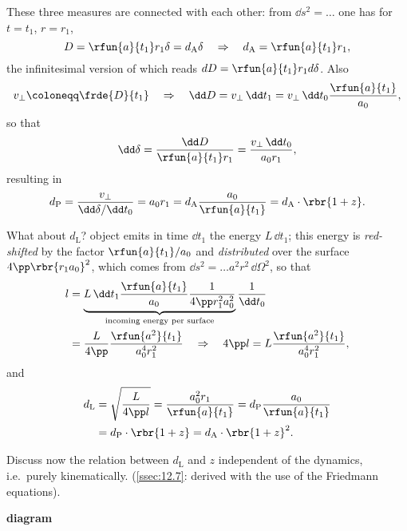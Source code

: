 These three measures are connected with each other: from $\dd s^2 = \ldots$ one
has for $t = t_1$, $r = r_1$,
\begin{equation}
D = \rfun{a}{t_1}r_1\delta = d_\text{A}\delta \quad \Rightarrow \quad
d_\text{A} = \rfun{a}{t_1}r_1,
\end{equation}
the infinitesimal version of which reads $dD = \rfun{a}{t_1}r_1d\delta$. Also
\begin{equation}
v_\perp \coloneqq \frde{D}{t_1} \quad\Rightarrow\quad
\dd D = v_\perp\,\dd t_1 = v_\perp\,\dd t_0 \frac{\rfun{a}{t_1}}{a_0},
\end{equation}
so that
\begin{equation}
\dd\delta = \frac{\dd D}{\rfun{a}{t_1}r_1} = \frac{v_\perp\,\dd t_0}{a_0 r_1},
\end{equation}
resulting in
\begin{equation}
d_\text{P} = \frac{v_\perp}{\dd \delta/\dd t_0} = a_0 r_1
= d_\text{A} \frac{a_0}{\rfun{a}{t_1}} = d_\text{A}\cdot\rbr{1+z}.
\end{equation}

What about $d_\text{L}$? object emits in time $\dd t_1$ the energy $L\,\dd t_1$;
this energy is \emph{red-shifted} by the factor $\rfun{a}{t_1}/a_0$ and
\emph{distributed} over the surface $4\pp\rbr{r_1 a_0}^2$, which comes from
$\dd s^2 = \ldots a^2 r^2 \,\dd \Omega^2$, so that
\begin{align}
l &= \underbrace{L\,\dd t_1 \frac{\rfun{a}{t_1}}{a_0}
\frac{1}{4\pp r_1^2 a_0^2}}_\text{incoming energy per surface}
\frac{1}{\dd t_0} \nonumber \\
&= \frac{L}{4\pp}\frac{\rfun{a^2}{t_1}}{a_0^4 r_1^2} \quad \Rightarrow \quad
4\pp l = L \frac{\rfun{a^2}{t_1}}{a_0^4 r_1^2},
\end{align}
and
\begin{align}
d_\text{L} &= \sqrt{\frac{L}{4\pp l}} = \frac{a_0^2 r_1}{\rfun{a}{t_1}}
= d_\text{P}\frac{a_0}{\rfun{a}{t_1}} \nonumber \\
&= d_\text{P}\cdot\rbr{1+z} = d_\text{A}\cdot\rbr{1+z}^2.
\end{align}

Discuss now the relation between $d_\text{L}$ and $z$ independent of the
dynamics, i.e.\ purely kinematically. (\cref{ssec:12.7}: derived with the use
of the Friedmann equations).

\textbf{diagram}

